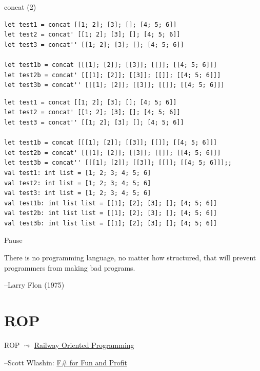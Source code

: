 \documentclass[t]{beamer}
\begin{document}
\begin{frame}[label={sec:org1c0cfc7},fragile]{concat (2)}
 \begin{verbatim}
let test1 = concat [[1; 2]; [3]; []; [4; 5; 6]]
let test2 = concat' [[1; 2]; [3]; []; [4; 5; 6]]
let test3 = concat'' [[1; 2]; [3]; []; [4; 5; 6]]

let test1b = concat [[[1]; [2]]; [[3]]; [[]]; [[4; 5; 6]]]
let test2b = concat' [[[1]; [2]]; [[3]]; [[]]; [[4; 5; 6]]] 
let test3b = concat'' [[[1]; [2]]; [[3]]; [[]]; [[4; 5; 6]]] 
\end{verbatim}

\begin{verbatim}
let test1 = concat [[1; 2]; [3]; []; [4; 5; 6]]
let test2 = concat' [[1; 2]; [3]; []; [4; 5; 6]]
let test3 = concat'' [[1; 2]; [3]; []; [4; 5; 6]]

let test1b = concat [[[1]; [2]]; [[3]]; [[]]; [[4; 5; 6]]]
let test2b = concat' [[[1]; [2]]; [[3]]; [[]]; [[4; 5; 6]]] 
let test3b = concat'' [[[1]; [2]]; [[3]]; [[]]; [[4; 5; 6]]];;
val test1: int list = [1; 2; 3; 4; 5; 6]
val test2: int list = [1; 2; 3; 4; 5; 6]
val test3: int list = [1; 2; 3; 4; 5; 6]
val test1b: int list list = [[1]; [2]; [3]; []; [4; 5; 6]]
val test2b: int list list = [[1]; [2]; [3]; []; [4; 5; 6]]
val test3b: int list list = [[1]; [2]; [3]; []; [4; 5; 6]]
\end{verbatim}
\end{frame}

\begin{frame}[label={sec:org14eabd9}]{Pause}
\begin{block}{}
There is no programming language, no matter how structured, 
that will prevent programmers from making bad programs.

\null\hfill--Larry Flon (1975)
\end{block}
\end{frame}

\section{ROP }
\label{sec:org9c9de39}
\begin{frame}[label={sec:org6220816}]{ROP}
\(\leadsto\) \href{./2 Railway Oriented Programming.pdf}{Railway Oriented Programming}

\null\hfill--Scott Wlashin: \href{https://fsharpforfunandprofit.com/rop/}{F\# for Fun and Profit}
\end{frame}
\end{document}
